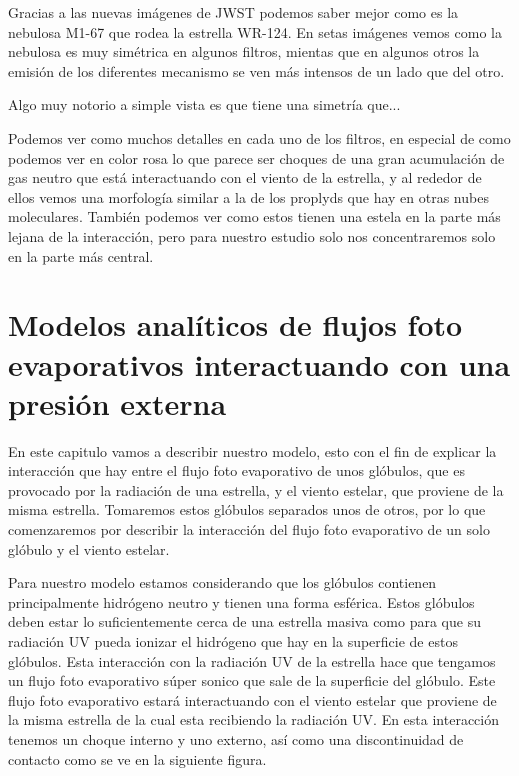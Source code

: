 \documentclass{book}
\begin{document}
Gracias a las nuevas imágenes de JWST podemos saber mejor como es la nebulosa M1-67 que rodea la estrella WR-124. En setas imágenes vemos como la nebulosa es muy simétrica en algunos filtros, mientas que en algunos otros la emisión de los diferentes mecanismo se ven más intensos de un lado que del otro.

Algo muy notorio a simple vista es que tiene una simetría que...


Podemos ver como muchos detalles en cada uno de los filtros, en especial de como podemos ver en color rosa lo que parece ser choques de una gran acumulación de gas neutro que está interactuando con el viento de la estrella, y al rededor de ellos vemos una morfología similar a la de los proplyds que hay en otras nubes moleculares. También podemos ver como estos tienen una estela en la parte más lejana de la interacción, pero para nuestro estudio solo nos concentraremos solo en la parte más central.

\chapter{Modelos analíticos de flujos foto evaporativos interactuando con una presión externa}

En este capitulo vamos  a describir nuestro modelo, esto con el fin de explicar la interacción que hay entre el flujo foto evaporativo de unos glóbulos, que es provocado por la radiación de una estrella, y el viento estelar, que proviene de la misma estrella. Tomaremos estos glóbulos separados unos de otros, por lo que comenzaremos por describir la interacción del flujo foto evaporativo de un solo glóbulo y el viento estelar.

Para nuestro modelo estamos considerando que los glóbulos contienen principalmente hidrógeno neutro y tienen una forma esférica. Estos glóbulos deben estar lo suficientemente cerca de una estrella masiva como para que su radiación UV pueda ionizar el hidrógeno que hay en la superficie de estos glóbulos. Esta interacción con la radiación UV de la estrella hace que tengamos un flujo foto evaporativo súper sonico que sale de la superficie del glóbulo. Este flujo foto evaporativo estará interactuando con el viento estelar que proviene de la misma estrella de la cual esta recibiendo la radiación UV. En esta interacción tenemos un choque interno y uno externo, así como una discontinuidad de contacto como se ve en la siguiente figura.
\end{document}
